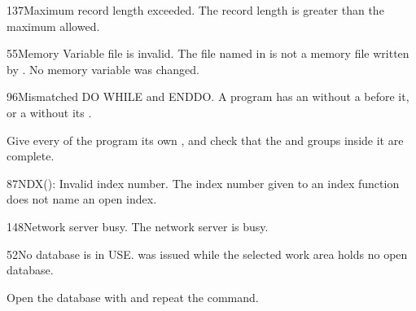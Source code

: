 \begin{XbaseMessageEntry}{137}{Maximum record length exceeded.}
The record length is greater than the maximum allowed.
\end{XbaseMessageEntry}

\begin{XbaseMessageEntry}{55}{Memory Variable file is invalid.}
The file named in  is not a memory file written by .  No memory variable was changed.
\end{XbaseMessageEntry}

\begin{XbaseMessageEntry}{96}{Mismatched DO WHILE and ENDDO.}
A program has an  without a  before it, or a  without its .

Give every  of the program its own , and check that the  and  groups inside it are complete.
\end{XbaseMessageEntry}

\begin{XbaseMessageEntry}{87}{NDX(): Invalid index number.}
The index number given to an index function does not name an open index.
\end{XbaseMessageEntry}

\begin{XbaseMessageEntry}{148}{Network server busy.}
The network server is busy.
\end{XbaseMessageEntry}

\begin{XbaseMessageEntry}{52}{No database is in USE.}
 was issued while the selected work area holds no open database.

Open the database with  and repeat the command.
\end{XbaseMessageEntry}

